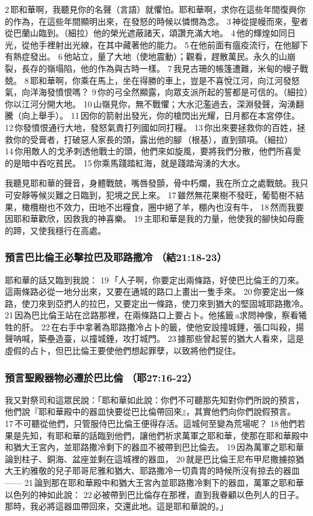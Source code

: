 2 耶和華啊，我聽見你的名聲（言語）就懼怕。耶和華啊，求你在這些年間復興你的作為，在這些年間顯明出來，在發怒的時候以憐憫為念。 3 神從提幔而來，聖者從巴蘭山臨到。（細拉）他的榮光遮蔽諸天，頌讚充滿大地。 4 他的輝煌如同日光，從他手裡射出光線，在其中藏著他的能力。 5 在他前面有瘟疫流行，在他腳下有熱症發出。 6 他站立，量了大地（使地震動）；觀看，趕散萬民。永久的山崩裂，長存的嶺塌陷，他的作為與古時一樣。 7 我見古珊的帳篷遭難，米甸的幔子戰兢。 8 耶和華啊，你乘在馬上，坐在得勝的車上，豈是不喜悅江河，向江河發怒氣，向洋海發憤恨嗎？ 9 你的弓全然顯露，向眾支派所起的誓都是可信的。（細拉）你以江河分開大地。 10 山嶺見你，無不戰懼；大水氾濫過去，深淵發聲，洶湧翻騰（向上舉手）。 11 因你的箭射出發光，你的槍閃出光耀，日月都在本宮停住。 12 你發憤恨通行大地，發怒氣責打列國如同打糧。 13 你出來要拯救你的百姓，拯救你的受膏者，打破惡人家長的頭，露出他的腳 （根基），直到頸項。（細拉） 14 你用敵人的戈矛刺透他戰士的頭，他們來如旋風，要將我們分散，他們所喜愛的是暗中吞吃貧民。 15 你乘馬踐踏紅海，就是踐踏洶湧的大水。

我聽見耶和華的聲音，身體戰兢，嘴唇發顫，骨中朽爛，我在所立之處戰兢。我只可安靜等候災難之日臨到，犯境之民上來。 17 雖然無花果樹不發旺，葡萄樹不結果，橄欖樹也不效力，田地不出糧食，圈中絕了羊，棚內也沒有牛， 18 然而我要因耶和華歡欣，因救我的神喜樂。 19 主耶和華是我的力量，他使我的腳快如母鹿的蹄，又使我穩行在高處。



\subsubsection{預言巴比倫王必擊拉巴及耶路撒冷 （結21:18-23）}
耶和華的話又臨到我說： 19 「人子啊，你要定出兩條路，好使巴比倫王的刀來。這兩條路必從一地分出來，又要在通城的路口上畫出一隻手來。 20 你要定出一條路，使刀來到亞捫人的拉巴，又要定出一條路，使刀來到猶大的堅固城耶路撒冷。 21 因為巴比倫王站在岔路那裡，在兩條路口上要占卜。他搖籤 a求問神像，察看犧牲的肝。 22 在右手中拿著為耶路撒冷占卜的籤，使他安設撞城錘，張口叫殺，揚聲呐喊，築壘造臺，以撞城錘，攻打城門。 23 據那些曾起誓的猶大人看來，這是虛假的占卜，但巴比倫王要使他們想起罪孽，以致將他們捉住。

\subsubsection{預言聖殿器物必遷於巴比倫 （耶27:16-22）}
我又對祭司和這眾民說：「耶和華如此說：你們不可聽那先知對你們所說的預言，他們說『耶和華殿中的器皿快要從巴比倫帶回來』，其實他們向你們說假預言。 17 不可聽從他們，只管服侍巴比倫王便得存活。這城何至變為荒場呢？ 18 他們若果是先知，有耶和華的話臨到他們，讓他們祈求萬軍之耶和華，使那在耶和華殿中和猶大王宮內，並耶路撒冷剩下的器皿不被帶到巴比倫去。 19 因為萬軍之耶和華論到柱子、銅海、盆座並剩在這城裡的器皿， 20 就是巴比倫王尼布甲尼撒擄掠猶大王約雅敬的兒子耶哥尼雅和猶大、耶路撒冷一切貴胄的時候所沒有掠去的器皿—— 21 論到那在耶和華殿中和猶大王宮內並耶路撒冷剩下的器皿，萬軍之耶和華以色列的神如此說： 22 必被帶到巴比倫存在那裡，直到我眷顧以色列人的日子。那時，我必將這器皿帶回來，交還此地。這是耶和華說的。」

